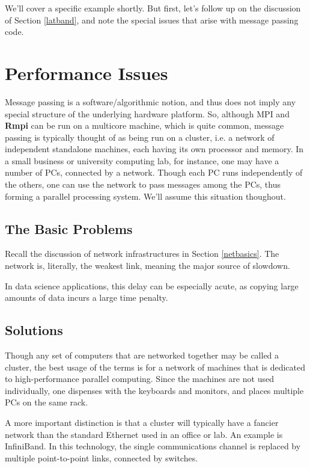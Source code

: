 We'll cover a specific example shortly.  But first, let's follow up on
the discussion of Section \ref{latband}, and note the special issues that
arise with message passing code.

\section{Performance Issues}

Message passing is a software/algorithmic notion, and thus does not
imply any special structure of the underlying hardware platform.  So,
although MPI and {\bf Rmpi} can be run on a multicore machine, which is
quite common,  message passing is typically thought of as being
run on a cluster, i.e. a network of independent standalone machines, each
having its own processor and memory.  In a small business or university
computing lab, for instance, one may have a number of PCs, connected by
a network.  Though each PC runs independently of the others, one
can use the network to pass messages among the PCs, thus forming a
parallel processing system.  We'll assume this situation thoughout.

\subsection{The Basic Problems}

Recall the discussion of network infrastructures in Section
\ref{netbasics}.  The network is, literally, the weakest link, meaning
the major source of slowdown.

In data science applications, this delay can be especially acute, as
copying large amounts of data incurs a large time penalty.


\subsection{Solutions}

Though any set of computers that are networked together may be called a
cluster, the best usage of the terms is for a network of machines that
is dedicated to high-performance parallel computing.  Since the machines
are not used individually, one dispenses with the keyboards and monitors,
and places multiple PCs on the same rack.

A more important distinction is that a cluster will typically have a
fancier network than the standard Ethernet used in an office or lab.  An
example is InfiniBand.  In this technology, the single communications
channel is replaced by multiple point-to-point links, connected by
switches.

